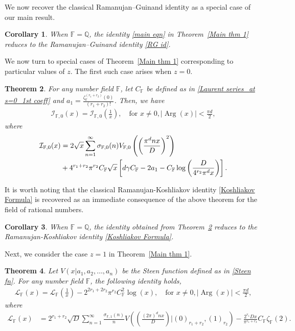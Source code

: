 \documentclass[12pt,reqno]{amsart}
\newcommand{\Arg}{\operatorname{Arg}}
\renewcommand{\(}{\left\(}
\renewcommand{\)}{\right\)}
\renewcommand{\[}{\left\[}
\renewcommand{\]}{\right\]}
\numberwithin{equation}{section}
\theoremstyle{plain}
\newtheorem{theorem}{Theorem}[section]
\newtheorem{corollary}[theorem]{Corollary}
\begin{document}
We now recover the classical Ramanujan–Guinand identity as a special case of our main result.
\begin{corollary}\label{Guinand from main thm}
When $\mathbb{F}=\mathbb{Q}$, the identity \eqref{main eqn} in Theorem~\ref{Main thm 1}
reduces to the Ramanujan–Guinand identity \eqref{RG id}.
\end{corollary}

We now turn to special cases of Theorem~\ref{Main thm 1} corresponding to particular values of $z$. The first such case arises when $z=0$.

\begin{theorem}\label{Case z=0 F}
For any number field $\mathbb{F}$, let $C_{\mathbb{F}}$ be defined as in \eqref{Laurent series_at s=0_1st coeff} and $a_1 =  \frac{\zeta^{(r_1+r_2)}_{\mathbb{F}}(0)}{(r_1+r_2)!}$. Then, we have
\begin{align*}
\mathcal{I}_{\mathbb{F}, 0}(x) = \mathcal{I}_{\mathbb{F}, 0}\left(\frac{1}{x}\right), \quad \mathrm{for} \,\, x \neq 0, |\Arg(x)| < \frac{\pi d}{2},
\end{align*}
where
\begin{align*}
\mathcal{I}_{\mathbb{F}, 0}(x) &= 2\sqrt{x}\sum_{n=1}^{\infty}\sigma_{\mathbb{F}, 0}(n)V_{\mathbb{F},0}\left(\left(\frac{\pi^{d} n x}{D}\right)^2\right) \notag \\
& + 4^{r_1+r_2}\pi^{r_2}C_{\mathbb{F}}\sqrt{x}\left[d\gamma C_\mathbb{F} - 2a_1 - C_\mathbb{F}\log\left(\frac{D}{4^{r_2}\pi^d x}\right)\right].
\end{align*}
\end{theorem}
It is worth noting that the classical Ramanujan-Koshliakov identity \eqref{Koshliakov Formula} is recovered as an immediate consequence of the above theorem for the field of rational numbers.

\begin{corollary}\label{Case Koshliakov id}
When $\mathbb{F}=\mathbb{Q}$, the identity obtained from Theorem~\ref{Case z=0 F} reduces to the Ramanujan-Koshliakov identity \eqref{Koshliakov Formula}.
\end{corollary}


Next, we consider the case $z=1$ in Theorem~\ref{Main thm 1}.
\begin{theorem}\label{Case z=1 F}
Let $V(x| a_1, a_2, \ldots, a_n)$ be the Steen function defined as in \eqref{Steen fn}. For any number field $\mathbb{F}$, the following identity holds,
\begin{align}\label{I_F(1,x)}
\mathcal{L}_{\mathbb{F}}(x) = \mathcal{L}_{\mathbb{F}}\left(\frac{1}{x}\right) - 2^{2r_1+2r_2}\pi^{r_2}C_{\mathbb{F}}^2 \log(x), \quad \mathrm{for}\,\, x \neq 0,  |\Arg(x)| < \frac{\pi d}{2},
\end{align}
where
\begin{align}
\mathcal{L}_{\mathbb{F}}(x) &=
2^{r_1+r_2}\sqrt{D}\sum_{n=1}^{\infty}\frac{\sigma_{\mathbb{F}, 1}(n)}{n}V\left(\left(\frac{(2\pi)^{d} n x}{D}\right)\bigg|\left(0\right)_{r_1 + r_2}, (1)_{r_2}\right) - \frac{2^{r_1}Dx}{\pi^{r_1+r_2}}C_{\mathbb{F}}\zeta_{\mathbb{F}}(2). \label{IFx}
\end{align}
\end{theorem}
\end{document}
